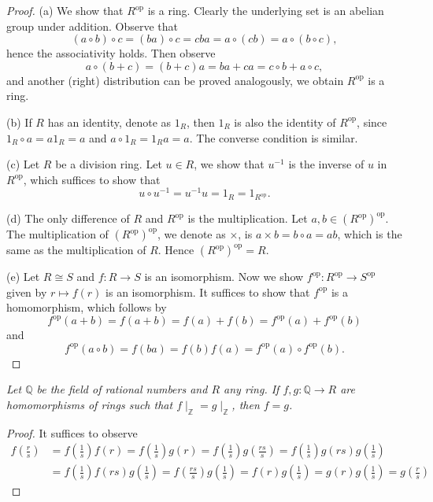 \begin{proof}
(a) We show that $R^{\mathrm{op}}$ is a ring. Clearly the underlying set is an abelian group under addition. Observe that 
$$
\left( a\circ b \right) \circ c=\left( ba \right) \circ c=cba=a\circ \left( cb \right) =a\circ \left( b\circ c \right) ,
$$
hence the associativity holds. Then observe 
$$
a\circ \left( b+c \right) =\left( b+c \right) a=ba+ca=c\circ b+a\circ c,
$$
and another (right) distribution can be proved analogously, we obtain $R^{\mathrm{op}}$ is a ring.\par
(b) If $R$ has an identity, denote as $1_R$, then $1_R$ is also the identity of $R^{\mathrm{op}}$, since $1_R\circ a=a1_R=a$ and $a\circ 1_R=1_Ra=a$. The converse condition is similar.\par
(c) Let $R$ be a division ring. Let $u\in R$, we show that $u^{-1}$ is the inverse of $u$ in $R^{\mathrm{op}}$, which suffices to show that 
$$
u\circ u^{-1}=u^{-1}u=1_R=1_{R^{\mathrm{op}}}.
$$\par
(d) The only difference of $R$ and $R^{\mathrm{op}}$ is the multiplication. Let $a,b\in (R^{\mathrm{op}})^{\mathrm{op}}$. The multiplication of $(R^{\mathrm{op}})^{\mathrm{op}}$, we denote as $\times$, is $a\times b=b\circ a=ab$, which is the same as the multiplication of $R$. Hence $(R^{\mathrm{op}})^{\mathrm{op}}=R$.\par
(e) Let $R\cong S$ and $f:R\to S$ is an isomorphism. Now we show $f^{\mathrm{op}}:R^{\mathrm{op}}\to S^{\mathrm{op}}$ given by $r\mapsto f(r)$ is an isomorphism. It suffices to show that $f^{\mathrm{op}}$ is a homomorphism, which follows by 
$$
f^{\mathrm{op}}\left( a+b \right) =f\left( a+b \right) =f\left( a \right) +f\left( b \right) =f^{\mathrm{op}}\left( a \right) +f^{\mathrm{op}}\left( b \right) 
$$
and 
$$
f^{\mathrm{op}}\left( a\circ b \right) =f\left( ba \right) =f\left( b \right) f\left( a \right) =f^{\mathrm{op}}\left( a \right) \circ f^{\mathrm{op}}\left( b \right) .
$$
\end{proof}
\begin{problem}\em
Let $\mathbb{Q}$ be the field of rational numbers and $R$ any ring. If $f,g:\mathbb{Q}\to R$ are homomorphisms of rings such that $f\mid_{\mathbb{Z}}=g\mid_{\mathbb{Z}}$, then $f=g$.
\end{problem}
\begin{proof}
It suffices to observe 
$$
\begin{aligned}
f\left( \frac{r}{s} \right) &=f\left( \frac{1}{s} \right) f\left( r \right) =f\left( \frac{1}{s} \right) g\left( r \right) =f\left( \frac{1}{s} \right) g\left( \frac{rs}{s} \right) =f\left( \frac{1}{s} \right) g\left( rs \right) g\left( \frac{1}{s} \right) 
\\
&=f\left( \frac{1}{s} \right) f\left( rs \right) g\left( \frac{1}{s} \right) =f\left( \frac{rs}{s} \right) g\left( \frac{1}{s} \right) =f\left( r \right) g\left( \frac{1}{s} \right) =g\left( r \right) g\left( \frac{1}{s} \right) =g\left( \frac{r}{s} \right) 
\end{aligned}
$$
\end{proof}
